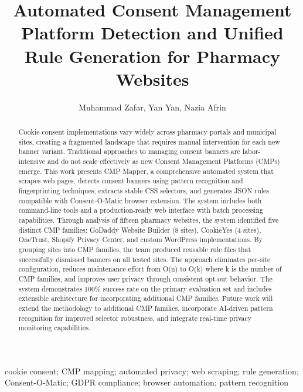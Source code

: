 \documentclass[conference]{IEEEtran}
\begin{document}
\title{Automated Consent Management Platform Detection and Unified Rule Generation for Pharmacy Websites}

\author{Muhammad Zafar, Yan Yan, Nazia Afrin}

\maketitle

\begin{abstract}

Cookie consent implementations vary widely across pharmacy portals and municipal sites, creating a fragmented landscape that requires manual intervention for each new banner variant. Traditional approaches to managing consent banners are labor-intensive and do not scale effectively as new Consent Management Platforms (CMPs) emerge. This work presents CMP Mapper, a comprehensive automated system that scrapes web pages, detects consent banners using pattern recognition and fingerprinting techniques, extracts stable CSS selectors, and generates JSON rules compatible with Consent-O-Matic browser extension. The system includes both command-line tools and a production-ready web interface with batch processing capabilities. Through analysis of fifteen pharmacy websites, the system identified five distinct CMP families: GoDaddy Website Builder (8 sites), CookieYes (4 sites), OneTrust, Shopify Privacy Center, and custom WordPress implementations. By grouping sites into CMP families, the team produced reusable rule files that successfully dismissed banners on all tested sites. The approach eliminates per-site configuration, reduces maintenance effort from O(n) to O(k) where k is the number of CMP families, and improves user privacy through consistent opt-out behavior. The system demonstrates 100\% success rate on the primary evaluation set and includes extensible architecture for incorporating additional CMP families. Future work will extend the methodology to additional CMP families, incorporate AI-driven pattern recognition for improved selector robustness, and integrate real-time privacy monitoring capabilities.

\end{abstract}

\begin{IEEEkeywords}

cookie consent; CMP mapping; automated privacy; web scraping; rule generation; Consent-O-Matic; GDPR compliance; browser automation; pattern recognition

\end{IEEEkeywords}
\end{document}
